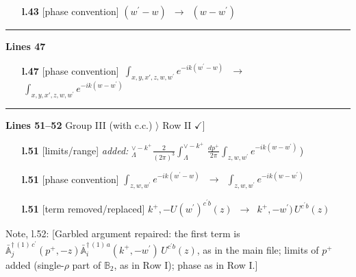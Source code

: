 \documentclass[10pt]{article}
\newenvironment{notebox}{\def\FrameCommand{{\color{notebar}\vrule width 1.5pt}\hspace{6pt}}\MakeFramed{\advance\hsize-\width\FrameRestore}\small}{\endMakeFramed}
\def\mf#1{\mathbb{#1}}
\begin{document}
\begin{itemize}[leftmargin=2.2em,itemsep=1pt,topsep=2pt]
\item[\textbf{l.43}] \textsf{\small [phase convention]} $\displaystyle (w^{\prime}-w)$\ $\longrightarrow$\ $\displaystyle (w-w^{\prime})$
\end{itemize}
\noindent\rule{\linewidth}{0.3pt}\par\noindent\textbf{Lines 47} \par
\begin{itemize}[leftmargin=2.2em,itemsep=1pt,topsep=2pt]
\item[\textbf{l.47}] \textsf{\small [phase convention]} $\displaystyle \, \int_{x,y,x',z,w,w^{\prime}} e^{-ik(w^{\prime}-w)}\,$\ $\longrightarrow$\ $\displaystyle \, \int_{x,y,x',z,w,w^{\prime}} e^{-ik(w-w^{\prime})}\,$
\end{itemize}
\noindent\rule{\linewidth}{0.3pt}\par\noindent\textbf{Lines 51--52} \quad \textsf{Group III (with c.c.) $\rangle$ Row II { $\checkmark$]}} \par
\begin{itemize}[leftmargin=2.2em,itemsep=1pt,topsep=2pt]
\item[\textbf{l.51}] \textsf{\small [limits/range]} \emph{added:} $\displaystyle _{\Lambda}^{\vee-k^{+}}$$\displaystyle \frac{2}{(2\pi)^{3}} \int_{\Lambda}^{\vee-k^{+}}\, \frac{dp^{+}}{2\pi}\int_{z,w,w^{\prime}} e^{-ik(w-w^{\prime})}\,${\color{gray}\small)}
\item[\textbf{l.51}] \textsf{\small [phase convention]} $\displaystyle \int_{z,w,w^{\prime}} e^{-ik(w^{\prime}-w)}\,$\ $\longrightarrow$\ $\displaystyle \int_{z,w,w^{\prime}} e^{-ik(w-w^{\prime})}\,$
\item[\textbf{l.51}] \textsf{\small [term removed/replaced]} $\displaystyle k^{+},- U(w^{\prime})^{c^{\prime}b}(z)$\ $\longrightarrow$\ $\displaystyle k^{+},-w^{\prime})\,U^{c^{\prime}b}(z)$
\end{itemize}
\begin{notebox}\textsf{\small Note, l.52:} [Garbled argument repaired: the first term is $\bar{\mf{A}}^{\dagger\,(1)\,c^{\prime}}_{j}(p^{+},-z)\bar{\mf{A}}^{\dagger\,(1)\,a}_{i}(k^{+},-w^{\prime})\,U^{c^{\prime}b}(z)$, as in the main file; limits of $p^{+}$ added (single-$\rho$ part of $\mf{B}_{2}$, as in Row I); phase as in Row I.]\end{notebox}
\end{document}
